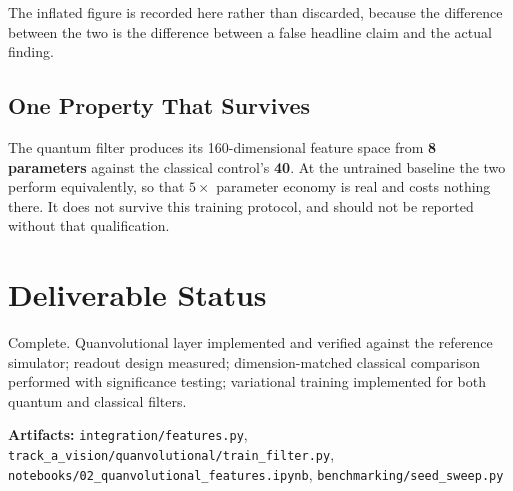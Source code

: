 \documentclass[11pt,a4paper]{article}
\begin{document}
The inflated figure is recorded here rather than discarded, because the
difference between the two is the difference between a false headline claim and
the actual finding.

\subsection{One Property That Survives}

The quantum filter produces its 160-dimensional feature space from
\textbf{8 parameters} against the classical control's \textbf{40}. At the
untrained baseline the two perform equivalently, so that $5\times$ parameter
economy is real and costs nothing there. It does not survive this training
protocol, and should not be reported without that qualification.

\section{Deliverable Status}

Complete. Quanvolutional layer implemented and verified against the reference
simulator; readout design measured; dimension-matched classical comparison
performed with significance testing; variational training implemented for both
quantum and classical filters.

\vspace{0.3cm}
\noindent\textbf{Artifacts:} \texttt{integration/features.py},
\texttt{track\_a\_vision/quanvolutional/train\_filter.py},
\texttt{notebooks/02\_quanvolutional\_features.ipynb},
\texttt{benchmarking/seed\_sweep.py}
\end{document}
